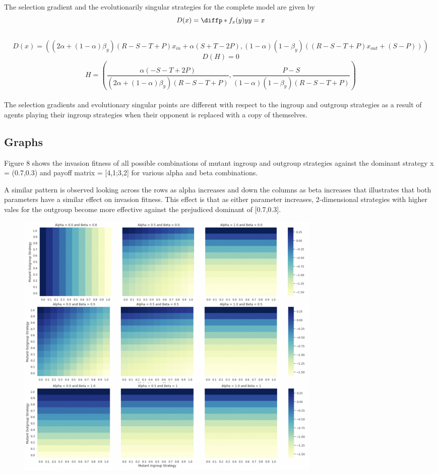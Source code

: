 \documentclass[]{llncs}
\begin{document}
The selection gradient and the evolutionarily singular strategies for the complete model are given by
\[
D(x) = \diffp*{f_x(y)}{y}{y=x}
\]
\\
\[
D(x) = ((2\alpha + (1-\alpha)\beta_y)(R - S - T + P) x_{in} + \alpha(S+T-2P), (1-\alpha)(1-\beta_y)((R - S - T + P) x_{out} + (S-P)))
\]
\[
D(H) = 0
\]
\[
H = (\frac{\alpha(-S-T+2P)}{(2\alpha + (1-\alpha)\beta_y)(R - S - T + P)}, \frac{P-S}{(1-\alpha)(1-\beta_y)(R - S - T +P)}) 
\]
\\
The selection gradients and evolutionary singular points are different with respect to the ingroup and outgroup strategies as a result of agents playing their ingroup strategies when their opponent is replaced with a copy of themselves. 

\subsection{Graphs}

Figure 8 shows the invasion fitness of all possible combinations of mutant ingroup and outgroup strategies against the dominant strategy x = (0.7,0.3) and payoff matrix = [4,1;3,2] for various alpha and beta combinations. 

A similar pattern is observed looking across the rows as alpha increases and down the columns as beta increases that illustrates that both parameters have a similar effect on invasion fitness. This effect is that as either parameter increases, 2-dimensional strategies with higher vales for the outgroup become more effective against the prejudiced dominant of [0.7,0.3]. 

\begin{figure}
\centering
\includegraphics[width=15cm]{images/alpha_beta}
\end{figure}
\end{document}
